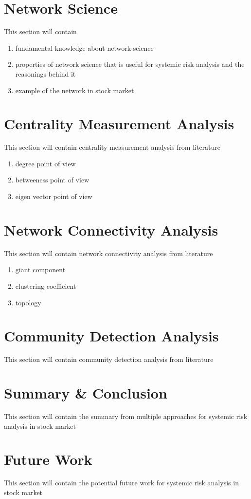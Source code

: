 \documentclass[a4paper,11pt]{article}
\begin{document}
\section{Network Science}
This section will contain
\begin{enumerate}
    \item fundamental knowledge about network science
    \item properties of network science that is useful for systemic risk analysis and the reasonings behind it
    \item example of the network in stock market
\end{enumerate}

\section{Centrality Measurement Analysis}
This section will contain centrality measurement analysis from literature
\begin{enumerate}
    \item degree point of view
    \item betweeness point of view
    \item eigen vector point of view
\end{enumerate}

\section{Network Connectivity Analysis}
This section will contain network connectivity analysis from literature
\begin{enumerate}
    \item giant component
    \item clustering coefficient
    \item topology
\end{enumerate}

\section{Community Detection Analysis}
This section will contain community detection analysis from literature

\section{Summary \& Conclusion}
This section will contain the summary from multiple approaches for systemic risk analysis in stock market

\section{Future Work}
This section will contain the potential future work for systemic risk analysis in stock market



\small
\end{document}
